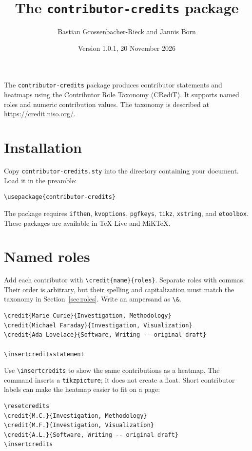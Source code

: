 \documentclass[a4paper,11pt]{article}
\title{The \texttt{contributor-credits} package}
\author{Bastian Grossenbacher-Rieck and Jannis Born}
\date{Version 1.0.1, 20 November 2026}
\begin{document}
\maketitle

The \texttt{contributor-credits} package produces contributor statements and heatmaps
using the Contributor Role Taxonomy (CRediT). It supports named roles and
numeric contribution values. The taxonomy is described at
\url{https://credit.niso.org/}.

\section{Installation}

Copy \texttt{contributor-credits.sty} into the directory containing your document.
Load it in the preamble:
\begin{verbatim}
\usepackage{contributor-credits}
\end{verbatim}
The package requires \texttt{ifthen}, \texttt{kvoptions}, \texttt{pgfkeys},
\texttt{tikz}, \texttt{xstring}, and \texttt{etoolbox}. These packages are
available in TeX Live and MiKTeX.

\section{Named roles}

Add each contributor with \verb|\credit{name}{roles}|. Separate roles with
commas. Their order is arbitrary, but their spelling and capitalization
must match the taxonomy in Section~\ref{sec:roles}. Write an ampersand as
\verb|\&|.

\begin{verbatim}
\credit{Marie Curie}{Investigation, Methodology}
\credit{Michael Faraday}{Investigation, Visualization}
\credit{Ada Lovelace}{Software, Writing -- original draft}

\insertcreditsstatement
\end{verbatim}

\noindent\insertcreditsstatement

\medskip
Use \verb|\insertcredits| to show the same contributions as a heatmap.
The command inserts a \texttt{tikzpicture}; it does not create a float.
Short contributor labels can make the heatmap easier to fit on a page:

\begin{verbatim}
\resetcredits
\credit{M.C.}{Investigation, Methodology}
\credit{M.F.}{Investigation, Visualization}
\credit{A.L.}{Software, Writing -- original draft}
\insertcredits
\end{verbatim}
\end{document}
